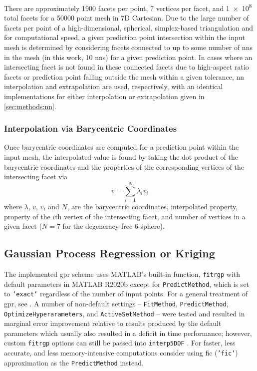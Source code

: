 \documentclass[preprint,12pt]{elsarticle}
\begin{document}
There are approximately 1900 facets per point, 7 vertices per facet, and \num{1e8} total facets for a \num{50000} point mesh in 7D Cartesian. Due to the large number of facets per point of a high-dimensional, spherical, simplex-based triangulation and for computational speed, a given prediction point intersection within the input mesh is determined by considering facets connected to up to some number of \glspl{nn} in the mesh (in this work, 10 \glspl{nn}) for a given prediction point. In cases where an intersecting facet is not found in these connected facets due to high-aspect ratio facets or prediction point falling outside the mesh within a given tolerance, \gls{nn} interpolation and extrapolation are used, respectively, with an identical implementations for either interpolation or extrapolation given in \cref{sec:methods:nn}.

\subsubsection{Interpolation via Barycentric Coordinates}

Once barycentric coordinates are computed for a prediction point within the input mesh, the interpolated value is found by taking the dot product of the barycentric coordinates and the properties of the corresponding vertices of the intersecting facet via
\begin{equation}
v=\underset{i=1}{\overset{N}{\sum }}\lambda _i v_i
\end{equation}
where $\lambda$, $v$, $v_i$ and $N$, are the barycentric coordinates, interpolated property, property of the $i$th vertex of the intersecting facet, and number of vertices in a given facet ($N = 7$ for the degeneracy-free 6-sphere).
    
\subsection{Gaussian Process Regression or Kriging} \label{sec:methods:gpr}

The implemented \gls{gpr} scheme uses MATLAB's built-in function, \texttt{fitrgp} with default parameters in MATLAB R2020b except for \texttt{PredictMethod}, which is set to \texttt{'exact'} regardless of the number of input points. For a general treatment of \gls{gpr}, see \cite{rasmussenGaussianProcessesMachine2006}. A number of non-default settings -- \texttt{FitMethod}, \texttt{PredictMethod}, \texttt{OptimizeHyperarameters}, and \texttt{ActiveSetMethod} -- were tested and resulted in marginal error improvement relative to results produced by the default parameters which usually also resulted in a deficit in time performance; however, custom \texttt{fitrgp} options can still be passed into \texttt{interp5DOF} \cite{bairdFiveDegreeofFreedom5DOF2020}. For faster, less accurate, and less memory-intensive computations consider using \gls{fic} (\texttt{'fic'}) approximation as the \texttt{PredictMethod} instead. %
\end{document}
